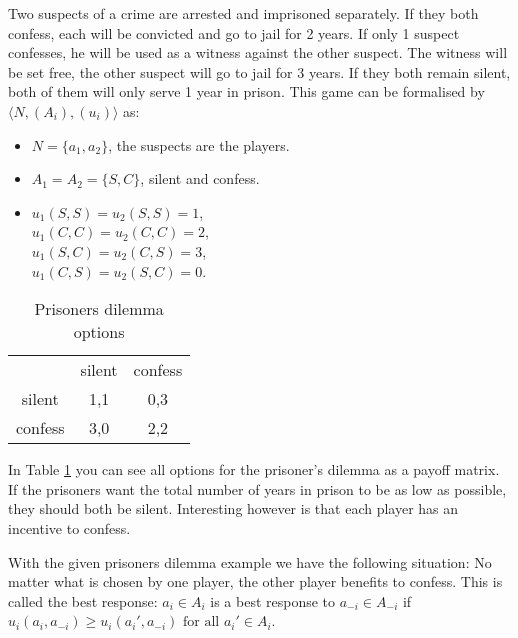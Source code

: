 Two suspects of a crime are arrested and imprisoned separately. If they both confess, each will be convicted and go to jail for 2 years. If only 1 suspect confesses, he will be used as a witness against the other suspect. The witness will be set free, the other suspect will go to jail for 3 years. If they both remain silent, both of them will only serve 1 year in prison. This game can be formalised by $\langle N, (A_i), (u_i) \rangle$ as:
\begin{itemize}
	\item $N = \{a_{1}, a_{2} \}$, the suspects are the players.
    \item $A_1 = A_2 = \{S, C\}$, silent and confess.
    \item $u_1(S, S) = u_2(S, S) = 1$, \\
    $u_1(C, C) = u_2(C, C) = 2$, \\
    $u_1(S, C) = u_2(C, S) = 3$, \\
    $u_1(C, S) = u_2(S, C) = 0$.

\end{itemize}

\begin{table}[h]
\centering
\begin{tabular}{ccc}
                             & silent                   & confess                   \\ \cline{2-3} 
\multicolumn{1}{c|}{silent}  & \multicolumn{1}{c|}{1,1} & \multicolumn{1}{c|}{0,3} \\ \cline{2-3} 
\multicolumn{1}{c|}{confess} & \multicolumn{1}{c|}{3,0} & \multicolumn{1}{c|}{2,2} \\ \cline{2-3} 
\end{tabular}
\caption{Prisoners dilemma options}
\label{prisoners-d}
\end{table}

In Table \ref{prisoners-d} you can see all options for the prisoner's dilemma as a payoff matrix. 
If the prisoners want the total number of years in prison to be as low as possible, they should both be silent. Interesting however is that each player has an incentive to confess. 

With the given prisoners dilemma example we have the following situation: No matter what is chosen by one player, the other player benefits to confess. This is called the best response: $a_i \in A_i $ is a best response to $ a_{-i} \in A_{-i} $ if $u_i(a_i, a_{-i}) \geq u_i(a_{i}', a_{-i}) \mbox{ for all } a_{i}' \in A_i$.

